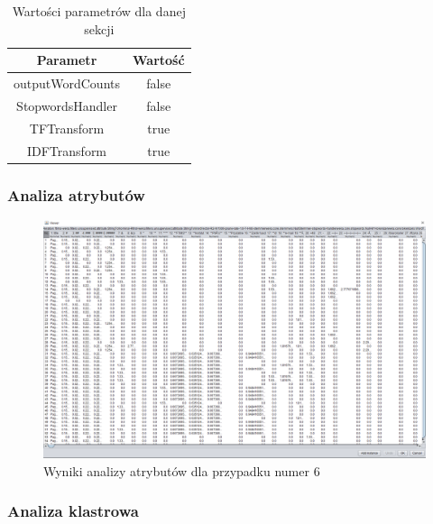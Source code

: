 \documentclass[../EDI_Task2_Karwowski_Kowalewski.tex]{subfiles}
\begin{document}
{{        \begin{table}[!htbp]
            \small
            \centering
            \begin{tabular}{|c|c|}
                \hline
                Parametr & Wartość \\ \hline
                outputWordCounts & false \\ \hline
                StopwordsHandler & false \\ \hline
                TFTransform & true \\ \hline
                IDFTransform & true \\ \hline
            \end{tabular}
            \caption{Wartości parametrów dla danej sekcji}
        \end{table}
        \FloatBarrier

        \subsubsection{Analiza atrybutów} {

            \begin{figure}[!htbp]
                \centering
                \includegraphics[width=\textwidth]{img/results1/ftims-case6.png}
                \caption{Wyniki analizy atrybutów dla przypadku numer 6}
            \end{figure}
            \FloatBarrier
        }

        \subsubsection{Analiza klastrowa} {

}}}
\end{document}
